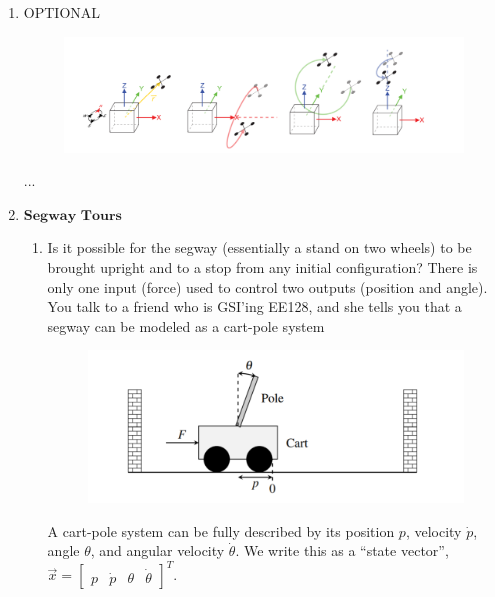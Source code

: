 \documentclass[11pt]{article}
\begin{document}
\begin{enumerate}
	      \newpage
	      
	      \item OPTIONAL
	      	\begin{figure}[h]
                \centering
                \includegraphics[scale=0.9]{q7a}
            \end{figure}
	      \begin{Answer}
	           ...
	      \end{Answer}
	      
	      
	      \newpage
	      
	\item $\textbf{Segway Tours}$
	      \begin{enumerate}
	      	\item Is it possible for the segway (essentially a stand on two wheels) to be brought upright and to a stop from any initial configuration? There is only one input (force) used to control two outputs (position and angle). You talk to a friend who is GSI'ing EE128, and she tells you that a segway can be modeled as a cart-pole system
	      	\begin{figure}[h]
                \centering
                \includegraphics[scale=0.9]{q8a}
            \end{figure}
	      	
	      	A cart-pole system can be fully described by its position $p$, velocity $\dot p$, angle $\theta$, and angular velocity $\dot \theta$. We write this as a “state vector”, $\vec x = \begin{bmatrix}
                    p & \dot p & \theta & \dot \theta
	      	    \end{bmatrix}^T.$
	      	

\end{enumerate}
\end{enumerate}
\end{document}
